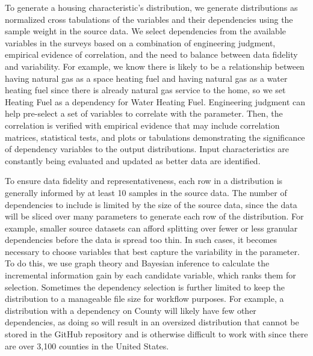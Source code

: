 To generate a housing characteristic's distribution, we generate distributions as normalized cross tabulations of the variables and their dependencies using the sample weight in the source data. We select dependencies from the available variables in the surveys based on a combination of engineering judgment, empirical evidence of correlation, and the need to balance between data fidelity and variability. For example, we know there is likely to be a relationship between having natural gas as a space heating fuel and having natural gas as a water heating fuel since there is already natural gas service to the home, so we set Heating Fuel as a dependency for Water Heating Fuel. Engineering judgment can help pre-select a set of variables to correlate with the parameter. Then, the correlation is verified with empirical evidence that may include correlation matrices, statistical tests, and plots or tabulations demonstrating the significance of dependency variables to the output distributions. Input characteristics are constantly being evaluated and updated as better data are identified.

To ensure data fidelity and representativeness, each row in a distribution is generally informed by at least 10 samples in the source data. The number of dependencies to include is limited by the size of the source data, since the data will be sliced over many parameters to generate each row of the distribution. For example, smaller source datasets can afford splitting over fewer or less granular dependencies before the data is spread too thin. In such cases, it becomes necessary to choose variables that best capture the variability in the parameter. To do this, we use graph theory and Bayesian inference to calculate the incremental information gain by each candidate variable, which ranks them for selection. Sometimes the dependency selection is further limited to keep the distribution to a manageable file size for workflow purposes. For example, a distribution with a dependency on County will likely have few other dependencies, as doing so will result in an oversized distribution that cannot be stored in the GitHub repository and is otherwise difficult to work with since there are over 3,100 counties in the United States.

